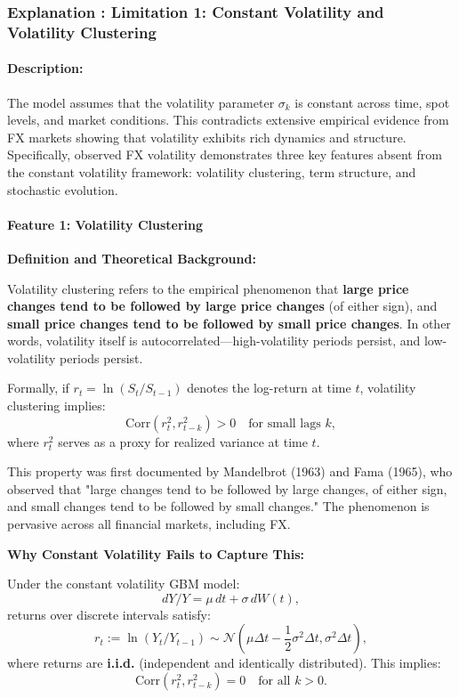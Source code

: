 \newpage
\subsubsection{Explanation : Limitation 1: Constant Volatility and Volatility Clustering}

\paragraph{Description:}
The model assumes that the volatility parameter $\sigma_k$ is constant across time, spot levels, and market conditions. This contradicts extensive empirical evidence from FX markets showing that volatility exhibits rich dynamics and structure. Specifically, observed FX volatility demonstrates three key features absent from the constant volatility framework: volatility clustering, term structure, and stochastic evolution.

\paragraph{Feature 1: Volatility Clustering}

\textbf{Definition and Theoretical Background:}

Volatility clustering refers to the empirical phenomenon that \textbf{large price changes tend to be followed by large price changes} (of either sign), and \textbf{small price changes tend to be followed by small price changes}. In other words, volatility itself is autocorrelated—high-volatility periods persist, and low-volatility periods persist.

Formally, if $r_t = \ln(S_t/S_{t-1})$ denotes the log-return at time $t$, volatility clustering implies:
\begin{equation}
	\text{Corr}(r_t^2, r_{t-k}^2) > 0 \quad \text{for small lags } k,
\end{equation}
where $r_t^2$ serves as a proxy for realized variance at time $t$. 

This property was first documented by Mandelbrot (1963) and Fama (1965), who observed that "large changes tend to be followed by large changes, of either sign, and small changes tend to be followed by small changes." The phenomenon is pervasive across all financial markets, including FX.

\textbf{Why Constant Volatility Fails to Capture This:}

Under the constant volatility GBM model:
\begin{equation}
	dY/Y = \mu \, dt + \sigma \, dW(t),
\end{equation}
returns over discrete intervals satisfy:
\begin{equation}
	r_t := \ln(Y_t/Y_{t-1}) \sim \mathcal{N}(\mu \Delta t - \frac{1}{2}\sigma^2 \Delta t, \sigma^2 \Delta t),
\end{equation}
where returns are \textbf{i.i.d.} (independent and identically distributed). This implies:
\begin{equation}
	\text{Corr}(r_t^2, r_{t-k}^2) = 0 \quad \text{for all } k > 0.
\end{equation}

